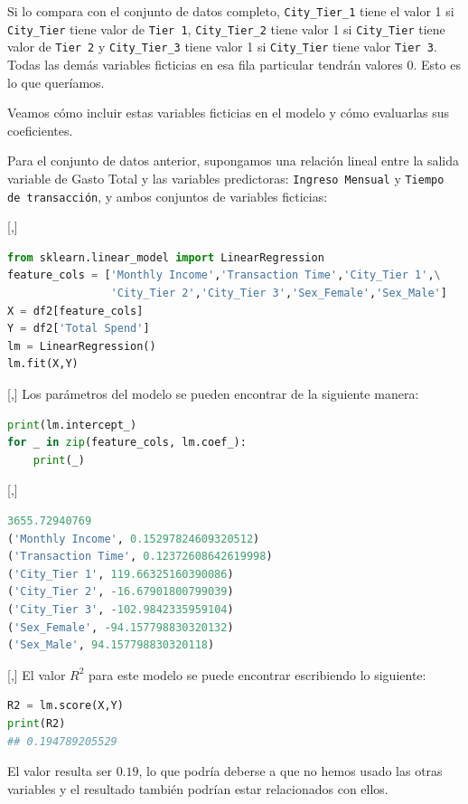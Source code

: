 Si lo compara con el conjunto de datos completo, \texttt{City\_Tier\_1} tiene el valor 1 si \texttt{City\_Tier}
tiene valor de \texttt{Tier 1}, \texttt{City\_Tier\_2} tiene valor 1 si \texttt{City\_Tier} tiene valor de \texttt{Tier 2} y
\texttt{City\_Tier\_3} tiene valor 1 si \texttt{City\_Tier} tiene valor \texttt{Tier 3}. Todas las demás variables ficticias en esa fila particular tendrán valores 0. Esto es lo que queríamos.


Veamos cómo incluir estas variables ficticias en el modelo y cómo evaluarlas
sus coeficientes.

Para el conjunto de datos anterior, supongamos una relación lineal entre la salida
variable de Gasto Total y las variables predictoras: \texttt{Ingreso Mensual} y
\texttt{Tiempo de transacción}, y ambos conjuntos de variables ficticias:

[,]{}

\begin{lstlisting}[language=Python]
from sklearn.linear_model import LinearRegression
feature_cols = ['Monthly Income','Transaction Time','City_Tier 1',\
                'City_Tier 2','City_Tier 3','Sex_Female','Sex_Male']
X = df2[feature_cols]
Y = df2['Total Spend']
lm = LinearRegression()
lm.fit(X,Y)
\end{lstlisting}

[,]{}
Los parámetros del modelo se pueden encontrar de la siguiente manera:
\begin{lstlisting}[language=Python]
print(lm.intercept_)
for _ in zip(feature_cols, lm.coef_):
    print(_)
\end{lstlisting}

[,]{}
\begin{lstlisting}[language=Python]
3655.72940769
('Monthly Income', 0.15297824609320512)
('Transaction Time', 0.12372608642619998)
('City_Tier 1', 119.66325160390086)
('City_Tier 2', -16.67901800799039)
('City_Tier 3', -102.9842335959104)
('Sex_Female', -94.157798830320132)
('Sex_Male', 94.157798830320118)
\end{lstlisting}

[,]{}
El valor $R^2$ para este modelo se puede encontrar escribiendo lo siguiente:
\begin{lstlisting}[language=Python]
R2 = lm.score(X,Y)
print(R2)
## 0.194789205529
\end{lstlisting}


El valor resulta ser $0.19$, lo que podría deberse a que no hemos usado las otras variables y el resultado también podrían estar relacionados con ellos. 

